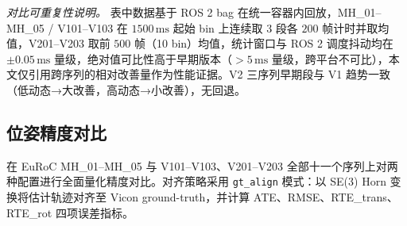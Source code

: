 \documentclass[letterpaper,journal]{IEEEtran}
\begin{document}
\noindent\textit{对比可重复性说明。} 表中数据基于 ROS 2 bag 在统一容器内回放，MH\_01--MH\_05 / V101--V103 在 $1500\,\mathrm{ms}$ 起始 bin 上连续取 $3$ 段各 $200$ 帧计时并取均值，V201--V203 取前 $500$ 帧（10 bin）均值，统计窗口与 ROS 2 调度抖动均在 $\pm 0.05\,\mathrm{ms}$ 量级，绝对值可比性高于早期版本（$>5\,\mathrm{ms}$ 量级，跨平台不可比），本文仅引用跨序列的相对改善量作为性能证据。V2 三序列早期段与 V1 趋势一致（低动态→大改善，高动态→小改善），无回退。

\subsection{位姿精度对比}
在 EuRoC MH\_01--MH\_05 与 V101--V103、V201--V203 全部十一个序列上对两种配置进行全面量化精度对比。对齐策略采用 \texttt{gt\_align} 模式：以 SE(3) Horn 变换将估计轨迹对齐至 Vicon ground-truth，并计算 ATE、RMSE、RTE\_trans、RTE\_rot 四项误差指标。
\end{document}
